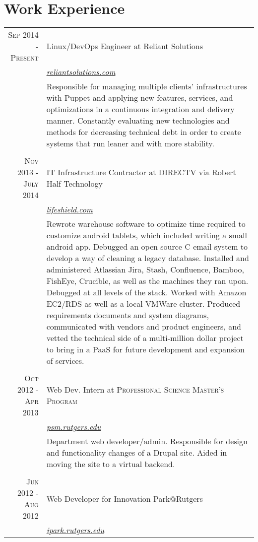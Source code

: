 \documentclass[a4paper, 10pt, onepage]{article} %
\begin{document}
\section{Work Experience}
\begin{tabular}{r|p{10cm}}
\textsc{Sep 2014 - Present} & {Linux/DevOps Engineer at Reliant Solutions}\\
&\small\emph{\href{http://reliantsolutions.com}{reliantsolutions.com}}\\
&\footnotesize{Responsible for managing multiple clients' infrastructures with Puppet and applying new features, services, and optimizations in a continuous integration and delivery manner. Constantly evaluating new technologies and methods for decreasing technical debt in order to create systems that run leaner and with more stability.}\\
\multicolumn{2}{c}{}\\
\textsc{Nov 2013 - July 2014} & {IT Infrastructure Contractor at DIRECTV via Robert Half Technology}\\
&\small\emph{\href{http://lifeshield.com}{lifeshield.com}}\\
&\footnotesize{Rewrote warehouse software to optimize time required to customize android tablets, which included writing a small android app. Debugged an open source C email system to develop a way of cleaning a legacy database. Installed and administered Atlassian Jira, Stash, Confluence, Bamboo, FishEye, Crucible, as well as the machines they ran upon. Debugged at all levels of the stack. Worked with Amazon EC2/RDS as well as a local VMWare cluster. Produced requirements documents and system diagrams, communicated with vendors and product engineers, and vetted the technical side of a multi-million dollar project to bring in a PaaS for future development and expansion of services.}\\
\multicolumn{2}{c}{}\\
\textsc{Oct 2012 - Apr 2013} & Web Dev. Intern at \textsc{Professional Science Master's Program}\\
& \small\emph{\href{http://psm.rutgers.edu}{psm.rutgers.edu}}\\
& \footnotesize{Department web developer/admin. Responsible for design and functionality changes of a Drupal site. Aided in moving the site to a virtual backend.}\\
\multicolumn{2}{c}{}\\
\textsc{Jun 2012 - Aug 2012} & Web Developer for Innovation Park@Rutgers\\
& \small\emph{\href{http://ipark.rutgers.edu}{ipark.rutgers.edu}}\\

\end{tabular}
\end{document}
